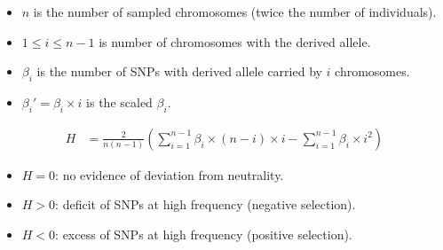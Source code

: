 \documentclass[8pt]{beamer}
\begin{document}
	\begin{frame}
		\centering
	\end{frame}
	\begin{frame}
		\begin{itemize}[label=$\bullet$]
			\item $n$ is the number of sampled chromosomes (twice the number of individuals).
			\item $1 \leq i \leq n - 1 $ is number of chromosomes with the derived allele.
			\item $\beta_i$ is the number of SNPs with derived allele carried by $i$ chromosomes.
			\item $\beta_i' = \beta_i \times i $ is the scaled $\beta_i$.
		\end{itemize}
	\end{frame}
\begin{frame}
	\begin{align*}
		H & = \frac{2}{n(n-1)} \left( \sum_{i=1}^{n-1} \beta_i \times (n-i) \times i   - \sum_{i=1}^{n-1} \beta_i \times i^2 \right)
	\end{align*}
	\begin{itemize}[label=$\bullet$]
		\item $H = 0$:  no evidence of deviation from neutrality. 
		\item $H > 0$: deficit of SNPs at high frequency (negative selection).
		\item $H < 0$: excess of SNPs at high frequency (positive selection).
	\end{itemize}
\end{frame}
\end{document}
